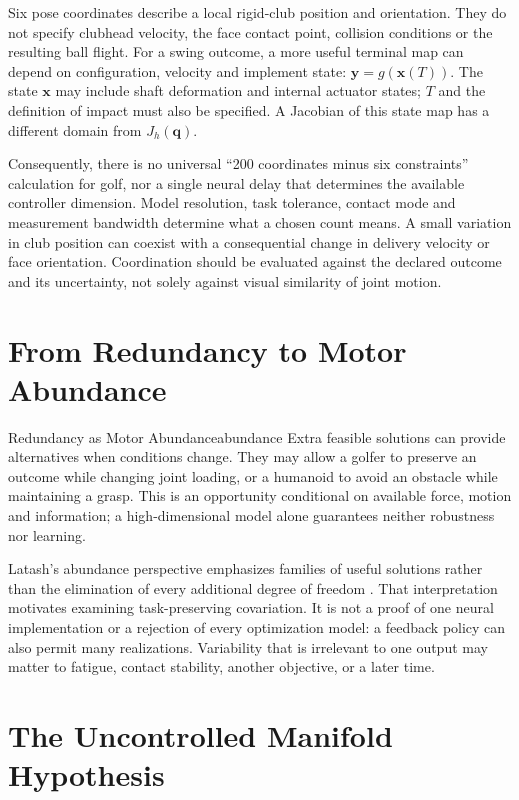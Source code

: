 Six pose coordinates describe a local rigid-club position and orientation.
They do not specify clubhead velocity, the face contact point, collision
conditions or the resulting ball flight.
For a swing outcome, a more useful terminal map can depend on configuration,
velocity and implement state: $\bm y=g(\bm x(T))$.
The state $\bm x$ may include shaft deformation and internal actuator states;
$T$ and the definition of impact must also be specified.
A Jacobian of this state map has a different domain from $J_h(\bm q)$.

Consequently, there is no universal ``200 coordinates minus six constraints''
calculation for golf, nor a single neural delay that determines the available
controller dimension. Model resolution, task tolerance, contact mode and
measurement bandwidth determine what a chosen count means.
A small variation in club position can coexist with a consequential change
in delivery velocity or face orientation.
Coordination should be evaluated against the declared outcome and its
uncertainty, not solely against visual similarity of joint motion.

\section{From Redundancy to Motor Abundance}

\begin{insight}{Redundancy as Motor Abundance}{abundance}
Extra feasible solutions can provide alternatives when conditions change.
They may allow a golfer to preserve an outcome while changing joint loading,
or a humanoid to avoid an obstacle while maintaining a grasp.
This is an opportunity conditional on available force, motion and information;
a high-dimensional model alone guarantees neither robustness nor learning.
\end{insight}

Latash's abundance perspective emphasizes families of useful solutions
rather than the elimination of every additional degree of freedom
\cite{Latash2012}.
That interpretation motivates examining task-preserving covariation.
It is not a proof of one neural implementation or a rejection of every
optimization model: a feedback policy can also permit many realizations.
Variability that is irrelevant to one output may matter to fatigue,
contact stability, another objective, or a later time.

\section{The Uncontrolled Manifold Hypothesis}

